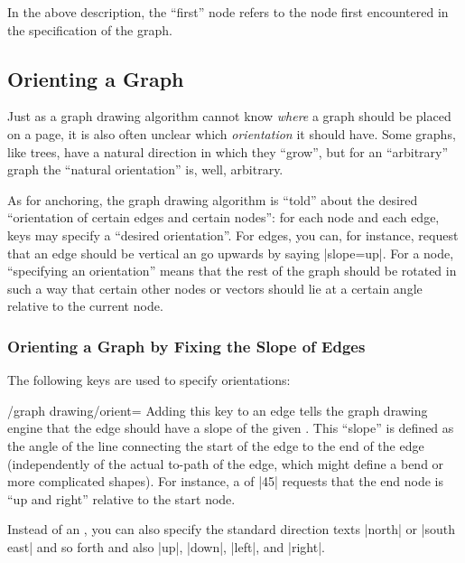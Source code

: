 {In the above description, the ``first'' node refers to the node first
encountered in the specification of the graph.



\subsection{Orienting a Graph}

\label{subsection-library-graphdrawing-standard-orientation}

Just as a graph drawing algorithm cannot know \emph{where} a graph
should be placed on a page, it is also often unclear which
\emph{orientation} it should have. Some graphs, like trees, have a
natural direction in which they ``grow'', but for an ``arbitrary''
graph the ``natural orientation'' is, well, arbitrary.

As for anchoring, the graph drawing algorithm is ``told'' about
the desired ``orientation of certain edges and certain nodes'': for
each node and each edge, keys may specify a ``desired
orientation''. For edges, you can, for instance, request that an
edge should be vertical an go upwards by saying |slope=up|. For a
node, ``specifying an orientation'' means that the rest of the graph
should be rotated in such a way that certain other nodes or
vectors should lie at a certain angle relative to the current node.


\subsubsection{Orienting a Graph by Fixing the Slope of Edges}

The following keys are used to specify orientations:
\begin{key}{/graph drawing/orient=}
  Adding this key to an edge tells the graph drawing engine that the
  edge should have a slope of the given . This ``slope''
  is defined as the angle of the line connecting the start of the edge
  to the end of the edge (independently of the actual to-path of the
  edge, which might define a bend or more complicated shapes). For
  instance, a  of |45| requests that the end node is ``up
  and right'' relative to the start node.
  
  Instead of an , you can also specify the standard
  direction texts |north| or |south east| and so forth and also
  |up|, |down|, |left|, and |right|.
    

\end{key}}
